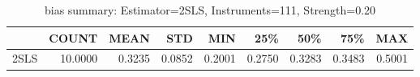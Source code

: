 \begin{table}[ht]
\centering
\caption{bias summary: Estimator=2SLS, Instruments=111, Strength=0.20}
\begin{tabular}{lrrrrrrrr}
\toprule
 & COUNT & MEAN & STD & MIN & 25\% & 50\% & 75\% & MAX \\
\midrule
2SLS & 10.0000 & 0.3235 & 0.0852 & 0.2001 & 0.2750 & 0.3283 & 0.3483 & 0.5001 \\
\bottomrule
\end{tabular}
\end{table}
